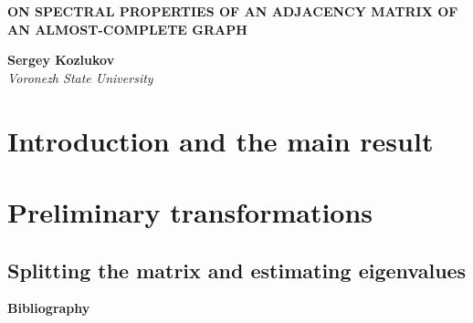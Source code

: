 \documentclass[12pt,a4paper,twoside]{article}
\theoremstyle{definition}
\begin{document}

\begin{center}
    \textbf{ON SPECTRAL PROPERTIES OF AN ADJACENCY MATRIX OF AN ALMOST-COMPLETE GRAPH}
    
    \textbf{Sergey Kozlukov}\\[2mm]
    \emph{Voronezh State University}
\end{center}


\begin{abstract}
    
\end{abstract}


\section*{Introduction and the main result}

\section*{Preliminary transformations}

\subsection*{Splitting the matrix and estimating eigenvalues}




\smallskip\centerline{\bf Bibliography} 

\end{document}
